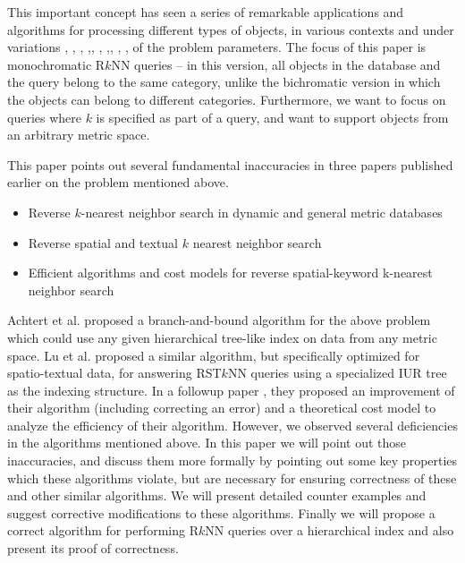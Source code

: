 \documentclass[prodmode,letterpaper]{acmsmall}
\newcommand{\rknn}{R$k$NN\xspace}
\newcommand{\rstknn}{RST$k$NN\xspace}
\begin{document}
This important concept has seen a series of remarkable applications and
algorithms for processing different types of
objects, in various contexts and under variations \cite{kang2007continuous}, \cite{safar2009voronoi}, \cite{tran2009reverse}, \cite{taniar2011spatial},\cite{shang2011finding}, \cite{cheema2012continuous}, \cite{ghaemi2012continuous},\cite{li2013efficient}, \cite{emrich2014reverse}, \cite{cabello2010facility}, \cite{bhattacharya2013new} of the problem parameters.
The focus of this paper is
monochromatic \rknn queries -- in this version, all objects in
the database and the query belong to the same category, unlike the bichromatic
version in which the objects can belong to different categories. Furthermore, we want to
focus on queries where $k$ is specified as part of a query, and want to support
objects from an arbitrary metric space.

This paper points out several fundamental inaccuracies in three papers published
earlier on the problem mentioned above.
\begin{itemize}
    \item Reverse $k$-nearest neighbor search in dynamic and general metric databases \cite{achtert2009reverse}
    \item Reverse spatial and textual $k$ nearest neighbor search \cite{lu2011reverse}
    \item Efficient algorithms and cost models for reverse spatial-keyword k-nearest neighbor search \cite{lu2014efficient}
\end{itemize}

Achtert et al.\cite{achtert2009reverse} proposed a branch-and-bound algorithm
for the above problem which could use any given hierarchical tree-like index
on data from any metric space. Lu et al. \cite{lu2011reverse} proposed a
similar algorithm, but specifically optimized for spatio-textual data, for answering
\rstknn queries using a specialized IUR tree as the
indexing structure. In a followup paper \cite{lu2014efficient}, they  proposed
an improvement of their algorithm (including correcting an error) and a
theoretical cost model to analyze the efficiency of their algorithm. However,
we observed several deficiencies in the algorithms mentioned above. In this
paper we will point out those inaccuracies, and discuss them more formally by
pointing out some key properties which
these algorithms violate, but are necessary for ensuring correctness of
these and other similar algorithms.  We will present detailed counter examples and suggest corrective
modifications to these algorithms.
Finally we will propose a correct algorithm for performing \rknn queries over a
hierarchical index and also present its proof of correctness.
\end{document}
